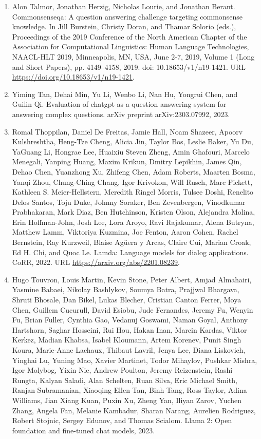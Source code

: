 \documentclass[11pt,UTF8,fontset=fandol]{ctexart}
\begin{document}
\begin{enumerate}[leftmargin=2em]
\item Alon Talmor, Jonathan Herzig, Nicholas Lourie, and Jonathan Berant. Commonsenseqa: A question answering challenge targeting commonsense knowledge. In Jill Burstein, Christy Doran, and Thamar Solorio (eds.), Proceedings of the 2019 Conference of the North American Chapter of the Association for Computational Linguistics: Human Language Technologies, NAACL-HLT 2019, Minneapolis, MN, USA, June 2-7, 2019, Volume 1 (Long and Short Papers), pp. 4149--4158, 2019. doi: 10.18653/v1/n19-1421. URL \url{https://doi.org/10.18653/v1/n19-1421}.
\item Yiming Tan, Dehai Min, Yu Li, Wenbo Li, Nan Hu, Yongrui Chen, and Guilin Qi. Evaluation of chatgpt as a question answering system for answering complex questions. arXiv preprint arXiv:2303.07992, 2023.
\item Romal Thoppilan, Daniel De Freitas, Jamie Hall, Noam Shazeer, Apoorv Kulshreshtha, Heng-Tze Cheng, Alicia Jin, Taylor Bos, Leslie Baker, Yu Du, YaGuang Li, Hongrae Lee, Huaixiu Steven Zheng, Amin Ghafouri, Marcelo Menegali, Yanping Huang, Maxim Krikun, Dmitry Lepikhin, James Qin, Dehao Chen, Yuanzhong Xu, Zhifeng Chen, Adam Roberts, Maarten Bosma, Yanqi Zhou, Chung-Ching Chang, Igor Krivokon, Will Rusch, Marc Pickett, Kathleen S. Meier-Hellstern, Meredith Ringel Morris, Tulsee Doshi, Renelito Delos Santos, Toju Duke, Johnny Soraker, Ben Zevenbergen, Vinodkumar Prabhakaran, Mark Diaz, Ben Hutchinson, Kristen Olson, Alejandra Molina, Erin Hoffman-John, Josh Lee, Lora Aroyo, Ravi Rajakumar, Alena Butryna, Matthew Lamm, Viktoriya Kuzmina, Joe Fenton, Aaron Cohen, Rachel Bernstein, Ray Kurzweil, Blaise Ag\"{u}era y Arcas, Claire Cui, Marian Croak, Ed H. Chi, and Quoc Le. Lamda: Language models for dialog applications. CoRR, 2022. URL \url{https://arxiv.org/abs/2201.08239}.
\item Hugo Touvron, Louis Martin, Kevin Stone, Peter Albert, Amjad Almahairi, Yasmine Babaei, Nikolay Bashlykov, Soumya Batra, Prajjwal Bhargava, Shruti Bhosale, Dan Bikel, Lukas Blecher, Cristian Canton Ferrer, Moya Chen, Guillem Cucurull, David Esiobu, Jude Fernandes, Jeremy Fu, Wenyin Fu, Brian Fuller, Cynthia Gao, Vedanuj Goswami, Naman Goyal, Anthony Hartshorn, Saghar Hosseini, Rui Hou, Hakan Inan, Marcin Kardas, Viktor Kerkez, Madian Khabsa, Isabel Kloumann, Artem Korenev, Punit Singh Koura, Marie-Anne Lachaux, Thibaut Lavril, Jenya Lee, Diana Liskovich, Yinghai Lu, Yuning Mao, Xavier Martinet, Todor Mihaylov, Pushkar Mishra, Igor Molybog, Yixin Nie, Andrew Poulton, Jeremy Reizenstein, Rashi Rungta, Kalyan Saladi, Alan Schelten, Ruan Silva, Eric Michael Smith, Ranjan Subramanian, Xiaoqing Ellen Tan, Binh Tang, Ross Taylor, Adina Williams, Jian Xiang Kuan, Puxin Xu, Zheng Yan, Iliyan Zarov, Yuchen Zhang, Angela Fan, Melanie Kambadur, Sharan Narang, Aurelien Rodriguez, Robert Stojnic, Sergey Edunov, and Thomas Scialom. Llama 2: Open foundation and fine-tuned chat models, 2023.

\end{enumerate}
\end{document}

